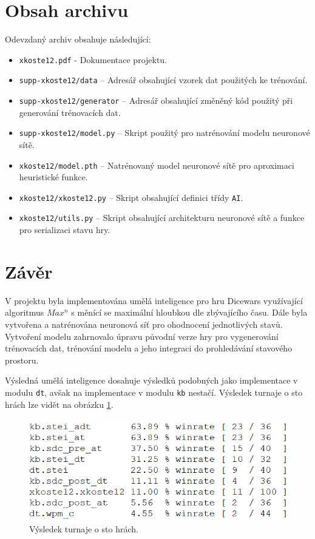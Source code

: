 \documentclass[a4paper,11pt]{article}
\begin{document}
	\section{Obsah archivu}
		Odevzdaný archiv obsahuje následující:
		
		\begin{itemize}
			\item \texttt{xkoste12.pdf} - Dokumentace projektu.
			\item \texttt{supp-xkoste12/data} -- Adresář obsahující vzorek dat použitých ke trénování.
			\item \texttt{supp-xkoste12/generator} -- Adresář obsahující změněný kód použitý při generování trénovacích dat.
			\item \texttt{supp-xkoste12/model.py} -- Skript použitý pro natrénování modelu neuronové sítě.
			\item \texttt{xkoste12/model.pth} -- Natrénovaný model neuronové sítě pro aproximaci heuristické funkce.
			\item \texttt{xkoste12/xkoste12.py} -- Skript obsahující definici třídy \texttt{AI}.
			\item \texttt{xkoste12/utils.py} -- Skript obsahující architekturu neuronové sítě a funkce pro serializaci stavu hry.
		\end{itemize}
		
	\section{Závěr}
	V projektu byla implementována umělá inteligence pro hru Dicewars využívající algoritmus \texttt{$Max^n$} s měnící se maximální hloubkou dle zbývajícího času. Dále byla vytvořena a natrénována neuronová síť pro ohodnocení jednotlivých stavů. Vytvoření modelu zahrnovalo úpravu původní verze hry pro vygenerování trénovacích dat, trénování modelu a jeho integraci do prohledávání stavového prostoru.
	
	Výsledná umělá inteligence dosahuje výsledků podobných jako implementace v modulu \texttt{dt}, avšak na implementace v modulu \texttt{kb} nestačí. Výsledek turnaje o sto hrách lze vidět na obrázku \ref{fig:winrate}.
	
	\begin{figure}[ht]
		\centering
		\includegraphics[scale=0.7]{winrate.png}
		\caption{Výsledek turnaje o sto hrách.}
		\label{fig:winrate}
	\end{figure}
	
\end{document}
